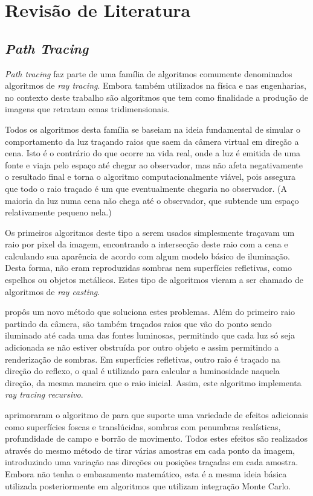 \documentclass[12pt]{article}
\begin{document}
\section{Revisão de Literatura}

\subsection{\emph{Path Tracing}}

\emph{Path tracing} faz parte de uma família de algoritmos comumente denominados algoritmos de
\emph{ray tracing}. Embora também utilizados na física e nas engenharias, no contexto deste trabalho
são algoritmos que tem como finalidade a produção de imagens que retratam cenas tridimensionais.

Todos os algoritmos desta família se baseiam na ideia fundamental de simular o comportamento da luz
traçando raios que saem da câmera virtual em direção a cena. Isto é o contrário do que ocorre na
vida real, onde a luz é emitida de uma fonte e viaja pelo espaço até chegar ao observador, mas não
afeta negativamente o resultado final e torna o algoritmo computacionalmente viável, pois assegura
que todo o raio traçado é um que eventualmente chegaria no observador. (A maioria da luz numa cena
não chega até o observador, que subtende um espaço relativamente pequeno nela.)\citep{pharr2010}

Os primeiros algoritmos deste tipo a serem usados simplesmente traçavam um raio por pixel da imagem,
encontrando a intersecção deste raio com a cena e calculando sua aparência de acordo com algum
modelo básico de iluminação. Desta forma, não eram reproduzidas sombras nem superfícies refletivas,
como espelhos ou objetos metálicos. Estes tipo de algoritmos vieram a ser chamado de algoritmos de
\emph{ray casting}.

 propôs um novo método que soluciona estes problemas. Além do primeiro raio
partindo da câmera, são também traçados raios que vão do ponto sendo iluminado até cada uma das
fontes luminosas, permitindo que cada luz só seja adicionada se não estiver obstruída por outro
objeto e assim permitindo a renderização de sombras. Em superfícies refletivas, outro raio é traçado
na direção do reflexo, o qual é utilizado para calcular a luminosidade naquela direção, da mesma
maneira que o raio inicial. Assim, este algoritmo implementa \emph{ray tracing recursivo}.

 aprimoraram o algoritmo de \citeauthor{whitted1980} para que suporte uma variedade
de efeitos adicionais como superfícies foscas e translúcidas, sombras com penumbras realísticas,
profundidade de campo e borrão de movimento. Todos estes efeitos são realizados através do mesmo
método de tirar várias amostras em cada ponto da imagem, introduzindo uma variação nas direções ou
posições traçadas em cada amostra. Embora não tenha o embasamento matemático, esta é a mesma ideia
básica utilizada posteriormente em algoritmos que utilizam integração Monte Carlo.
\end{document}
